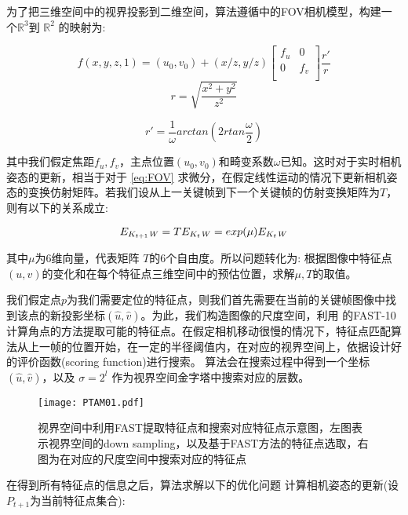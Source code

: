 为了把三维空间中的视界投影到二维空间，算法遵循\cite{Klein2007}中的FOV相机模型，构建一个$\mathbb{R}^3$到 $\mathbb{R}^2$ 的映射为:

\begin{equation}
\label{eq:FOV}
f(x,y,z,1)=(u_0,v_0) + (x/z,y/z) 
\begin{bmatrix}
       f_u  & 0 \\
       0 & f_v  \\
\end{bmatrix} \frac{r'}{r}
\end{equation}
\begin{equation}
r= \sqrt{\frac{x^2+y^2}{z^2}}
\end{equation}

\begin{equation}
r'= \frac{1}{\omega} arctan(2rtan\frac{\omega}{2})
\end{equation}

其中我们假定焦距$f_u,f_v$，主点位置$(u_0,v_0)$和畸变系数$\omega$已知。这时对于实时相机姿态的更新，相当于对于 \autoref{eq:FOV} 求微分，在假定线性运动的情况下更新相机姿态的变换仿射矩阵。若我们设从上一关键帧到下一个关键帧的仿射变换矩阵为$T$，则有以下的关系成立:

\begin{equation}
E_{K_{t+1}\mathit{W}}  = T E_{K_{t}\mathit{W}} = exp(\mu) E_{K_{t}\mathit{W}}
\end{equation}

其中$\mu$为6维向量，代表矩阵 $T$的6个自由度。所以问题转化为: 根据图像中特征点$(u,v)$的变化和在每个特征点三维空间中的预估位置，求解$\mu,T$的取值。


我们假定点$p$为我们需要定位的特征点，则我们首先需要在当前的关键帧图像中找到该点的新投影坐标$(\hat{u},\hat{v})$。为此，我们构造图像的尺度空间，利用 %
的FAST-10\cite{Rosten2006}计算角点的方法提取可能的特征点。在假定相机移动很慢的情况下，特征点匹配算法从上一帧的位置开始，在一定的半径阈值内，在对应的视界空间上，依据设计好的评价函数(scoring function)进行搜索。
算法会在搜索过程中得到一个坐标$(\hat{u},\hat{v})$，以及 $\sigma=2^l$ 作为视界空间金字塔中搜索对应的层数。

\begin{figure}[!htbp]
\centering
\texttt{[image: PTAM01.pdf]}
\caption{视界空间中利用FAST提取特征点和搜索对应特征点示意图，左图表示视界空间的down sampling，以及基于FAST方法的特征点选取，右图为在对应的尺度空间中搜索对应的特征点}
\label{fig:PTAM01}
\end{figure}
在得到所有特征点的信息之后，算法求解以下的优化问题
计算相机姿态的更新(设$P_{t+1}$为当前特征点集合):

